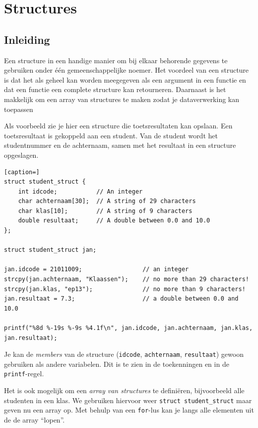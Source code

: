 \documentclass[a4paper,10pt,fleqn,twoside]{article}
\begin{document}
\clearpage
\section{Structures}


\subsection{Inleiding}
\label{sec:struct_inleiding}
Een structure in een handige manier om bij elkaar behorende gegevens te gebruiken onder één gemeenschappelijke noemer. Het voordeel van een structure is dat het als geheel kan worden meegegeven als een argument in een functie en dat een functie een complete structure kan retourneren. Daarnaast is het makkelijk om een array van structures te maken zodat je dataverwerking kan toepassen

Als voorbeeld zie je hier een structure die toetsresultaten kan opslaan. Een toetsresultaat is gekoppeld aan een student. Van de student wordt het studentnummer en de achternaam, samen met het resultaat in een structure opgeslagen.

\begin{lstlisting}[caption=]
struct student_struct {
	int idcode;           // An integer
	char achternaam[30];  // A string of 29 characters
    char klas[10];        // A string of 9 characters
	double resultaat;     // A double between 0.0 and 10.0
};

struct student_struct jan;

jan.idcode = 21011009;                 // an integer
strcpy(jan.achternaam, "Klaassen");    // no more than 29 characters!
strcpy(jan.klas, "ep13");              // no more than 9 characters!
jan.resultaat = 7.3;                   // a double between 0.0 and 10.0

printf("%8d %-19s %-9s %4.1f\n", jan.idcode, jan.achternaam, jan.klas, jan.resultaat);
\end{lstlisting}

Je kan de \textsl{members} van de structure (\lstinline|idcode|, \lstinline|achternaam|, \lstinline|resultaat|) gewoon gebruiken als andere variabelen. Dit is te zien in de toekenningen en in de \lstinline|printf|-regel.

Het is ook mogelijk om een \textsl{array van structures} te definiëren, bijvoorbeeld alle studenten in een klas. We gebruiken hiervoor weer \lstinline|struct student_struct| maar geven nu een array op. Met behulp van een \lstinline|for|-lus kan je langs alle elementen uit de de array ``lopen''.
\end{document}
